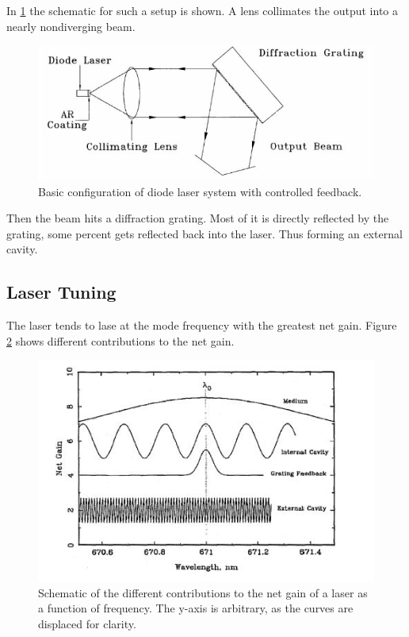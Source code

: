 In \ref{fig:cavity} the schematic for such a setup is shown. 
A lens collimates the output into a nearly nondiverging beam. 

\begin{figure}
    \centering
    \includegraphics[width=\textwidth]{content/outer_cavity.jpg}
    \caption{Basic configuration of diode laser system with controlled feedback. \cite{Anleitung}}
    \label{fig:cavity}
  \end{figure}

Then the beam hits a diffraction grating. Most of it is directly reflected by the grating, some percent gets reflected back into the laser. Thus forming an external cavity. 

\subsection{Laser Tuning}
The laser tends to lase at the mode frequency with the greatest net gain.
Figure \ref{fig:wavelength} shows different contributions to the net gain. 

\begin{figure}
    \centering
    \includegraphics[width=\textwidth]{content/wavelength.jpg}
    \caption{Schematic of the different contributions to the net gain of a laser as a function of frequency. The y-axis is arbitrary, as the curves are displaced for clarity. \cite{Anleitung}}
    \label{fig:wavelength}
  \end{figure}

